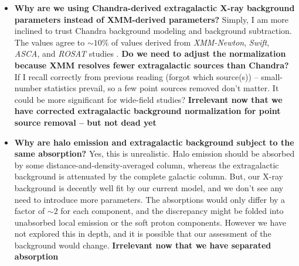\documentclass[twocolumn,tighten,trackchanges]{aastex61}
\newcommand*{\abt}{\mathord{\sim}} %
\begin{document}
\begin{itemize}
    \item \textbf{Why are we using Chandra-derived extragalactic X-ray background
        parameters instead of XMM-derived parameters?}
        Simply, I am more inclined to trust Chandra background modeling and
        background subtraction.
        The \citet{hickox2006} values agree to $\abt 10\%$ of values derived
        from \textit{XMM-Newton}, \textit{Swift}, \textit{ASCA}, and
        \textit{ROSAT} studies
        \citep{chen1997, kushino2002, de-luca2004, moretti2009}.
        \textbf{Do we need to adjust the normalization because XMM resolves
        fewer extragalactic sources than Chandra?}
        If I recall correctly from previous reading (forgot which source(s)) --
        small-number statistics prevail, so a few point sources removed don't
        matter.  It could be more significant for wide-field studies?
        \textbf{Irrelevant now that we have corrected extragalactic background normalization for point source removal -- but not dead yet}
    \item \textbf{Why are halo emission and extragalactic background subject to
        the same absorption?}
        Yes, this is unrealistic.  Halo emission should be absorbed by some
        distance-and-density-averaged column, whereas the extragalactic
        background is attenuated by the complete galactic column.
        But, our X-ray background is decently well fit by our current model,
        and we don't see any need to introduce more parameters.
        The absorptions would only differ by a factor of $\abt 2$ for each
        component, and the discrepancy might be folded into unabsorbed local
        emission or the soft proton components.
        However we have not explored this in depth, and it is possible that our
        assessment of the background would change.
        \textbf{Irrelevant now that we have separated absorption}
\end{itemize}
\end{document}
